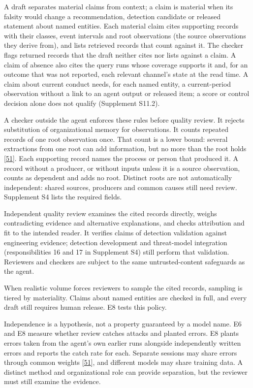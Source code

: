 \documentclass[acmlarge,nonacm]{acmart}
\begin{document}
A draft separates material claims from context; a claim is material when
its falsity would change a recommendation, detection candidate or
released statement about named entities. Each material claim cites
supporting records with their classes, event intervals and root
observations (the source observations they derive from), and lists
retrieved records that count against it. The checker flags returned
records that the draft neither cites nor lists against a claim. A claim
of absence also cites the query runs whose coverage supports it and, for
an outcome that was not reported, each relevant channel's state at the
read time. A claim about current conduct needs, for each named entity, a
current-period observation without a link to an agent output or released
item; a score or control decision alone does not qualify (Supplement
S11.2).

A checker outside the agent enforces these rules before quality review.
It rejects substitution of organizational memory for observations. It
counts repeated records of one root observation once. That count is a
lower bound: several extractions from one root can add information, but
no more than the root holds
{[}\protect\hyperlink{ref-Bara2026EpistemicSybil}{51}{]}. Each
supporting record names the process or person that produced it. A record
without a producer, or without inputs unless it is a source observation,
counts as dependent and adds no root. Distinct roots are not
automatically independent: shared sources, producers and common causes
still need review. Supplement S4 lists the required fields.

Independent quality review examines the cited records directly, weighs
contradicting evidence and alternative explanations, and checks
attribution and fit to the intended reader. It verifies claims of
detection validation against engineering evidence; detection development
and threat-model integration (responsibilities 16 and 17 in Supplement
S4) still perform that validation. Reviewers and checkers are subject to
the same untrusted-content safeguards as the agent.

When realistic volume forces reviewers to sample the cited records,
sampling is tiered by materiality. Claims about named entities are
checked in full, and every draft still requires human release. E8 tests
this policy.

Independence is a hypothesis, not a property guaranteed by a model name.
E6 and E8 measure whether review catches attacks and planted errors. E8
plants errors taken from the agent's own earlier runs alongside
independently written errors and reports the catch rate for each.
Separate sessions may share errors through common weights
{[}\protect\hyperlink{ref-Bara2026EpistemicSybil}{51}{]}, and different
models may share training data. A distinct method and organizational
role can provide separation, but the reviewer must still examine the
evidence.
\end{document}
